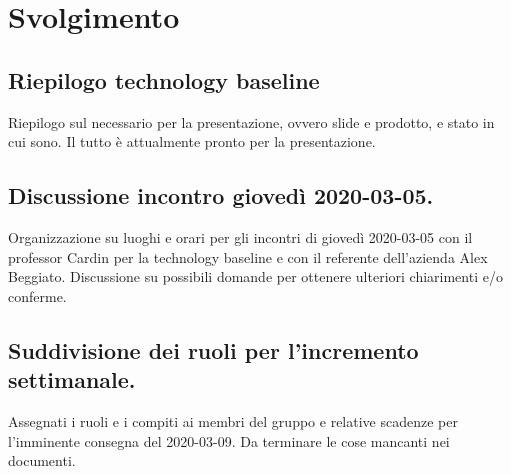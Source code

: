 \newpage
\section*{Svolgimento}

	\subsection*{Riepilogo technology baseline}
		Riepilogo sul necessario per la presentazione, ovvero slide e prodotto, e stato in cui sono.
		\newline
		Il tutto è attualmente pronto per la presentazione.

	\subsection*{Discussione incontro giovedì 2020-03-05.}
		Organizzazione su luoghi e orari per gli incontri di giovedì 2020-03-05 con il professor Cardin per la technology baseline e con il referente dell'azienda Alex Beggiato.
		\newline
		Discussione su possibili domande per ottenere ulteriori chiarimenti e/o conferme.

	\subsection*{Suddivisione dei ruoli per l'incremento settimanale.}
		Assegnati i ruoli e i compiti ai membri del gruppo e relative scadenze per l'imminente consegna del 2020-03-09.
		\newline
		Da terminare le cose mancanti nei documenti.
